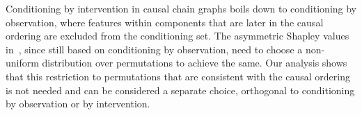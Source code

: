 \documentclass{article}
\begin{document}
Conditioning by intervention in causal chain graphs boils down to conditioning by observation, where features within components that are later in the causal ordering are excluded from the conditioning set. The asymmetric Shapley values in~\cite{frye2019asymmetric}, since still based on conditioning by observation, need to choose a non-uniform distribution over permutations to achieve the same. Our analysis shows that this restriction to permutations that are consistent with the causal ordering is not needed and can be considered a separate choice, orthogonal to conditioning by observation or by intervention.

\end{document}

